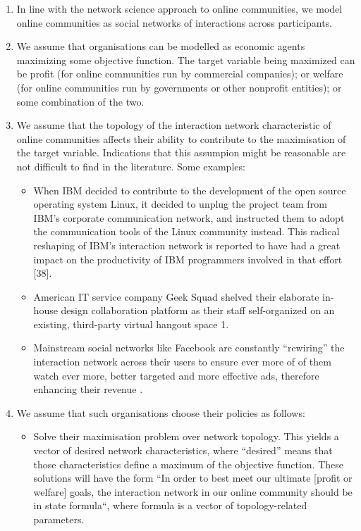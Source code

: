 \begin{enumerate}
\item In line with the network science approach to online communities, we model online communities as social networks of interactions across participants. 
\item We assume that organisations can be modelled as economic agents maximizing some objective function. The target variable being maximized can be profit (for online communities run by commercial companies); or welfare (for online communities run by governments or other nonprofit entities); or some combination of the two. 
\item We assume that the topology of the interaction network characteristic of online communities affects their ability to contribute to the maximisation of the target variable. Indications that this assumpion might be reasonable are not difficult to find in the literature. Some examples:
\begin{itemize}
	\item When IBM decided to contribute to the development of the open source operating system Linux, it decided to unplug the project team from IBM's corporate communication network, and instructed them to adopt the communication tools of the Linux community instead. This radical reshaping of IBM's interaction network is reported to have had a great impact on the productivity of IBM programmers involved in that effort [38]. 
	\item American IT service company Geek Squad shelved their elaborate in-house design collaboration platform as their staff self-organized on an existing, third-party virtual hangout space \cite{tapscott2008wikinomics}1. 
	\item Mainstream social networks like Facebook are constantly “rewiring” the interaction network across their users to ensure ever more of of them watch ever more, better targeted and more effective ads, therefore enhancing their revenue \cite{slegg2014facebook}. 
	\end{itemize}
\item We assume that such organisations choose their policies as follows: 
\begin{itemize} 
	\item Solve their maximisation problem over network topology. This yields a vector of desired network characteristics, where “desired” means that those characteristics define a maximum of the objective function. These solutions will have the form “In order to best meet our ultimate [profit or welfare] goals, the interaction network in our online community should be in state formula“, where formula is a vector of topology-related parameters.

\end{itemize}
\end{enumerate}
